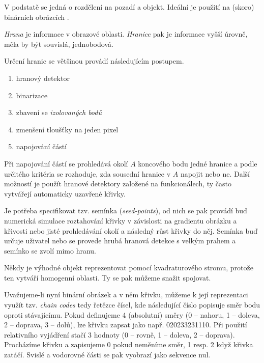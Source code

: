 V podstatě se jedná o rozdělení na pozadí a objekt. Ideální je použití na (skoro) binárních obrázcích . 


{\em Hrana} je informace v obrazové oblasti. {\em Hranice} pak je informace vyšší úrovně, měla by být souvislá, 
jednobodová.

Určení hranic se většinou provádí následujícím postupem.

\begin{enumerate}
\item hranový detektor
\item binarizace
\item zbavení se {\em izolovaných bodů}
\item zmenšení tloušťky na jeden pixel
\item napojování částí
\end{enumerate}

Při napojování částí se prohledává okolí $A$ koncového bodu jedné hranice a podle určitého kritéria se
rozhoduje, zda sousední hranice v $A$ napojit nebo ne. Další možností je  použít
hranové detektory založené na funkcionálech, ty často vytvářejí automaticky uzavřené křivky.


Je potřeba specifikovat tzv. semínka ({\em seed-points}), od nich se pak provádí buď numerická simulace roztahování
křivky v závislosti na gradientu obrázku a křivosti nebo jisté prohledávání okolí a následný růst křivky do něj.
Semínka buď určuje uživatel nebo se provede hrubá hranová detekce s velkým prahem a semínko se zvolí mimo hranu.

Někdy je výhodné objekt reprezentovat pomocí kvadraturového stromu, protože ten vytváří
homogenní oblasti. Ty se pak můžeme snažit spojovat.

Uvažujeme-li nyní binární obrázek a v něm křivku, můžeme k její reprezentaci využít tzv. {\em chain codes} tedy
řetězce čísel, kde následující číslo popisuje směr bodu oproti stávajícímu. Pokud definujeme 4 (absolutní) směry
(0 -- nahoru, 1 -- doleva, 2 -- doprava, 3 -- dolů), lze křivku zapsat jako např. 020233231110. Při použití 
relativního vyjádření stačí 3 hodnoty (0 -- rovně, 1 -- doleva, 2 -- doprava). Procházíme křivku a zapisujeme
0 pokud neměníme směr, 1 resp. 2 když křivka zatáčí. Svislé a vodorovné části se pak vyobrazí jako sekvence nul.

